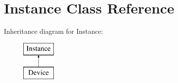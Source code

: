 \hypertarget{class_open_chams_1_1_instance}{\section{Instance Class Reference}
\label{class_open_chams_1_1_instance}
}
Inheritance diagram for Instance\-:\begin{figure}[H]
\begin{center}
\leavevmode
\includegraphics[height=2.000000cm]{class_open_chams_1_1_instance}
\end{center}
\end{figure}
